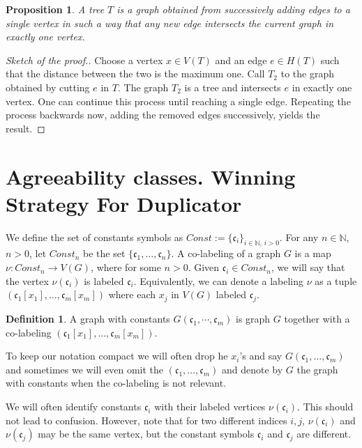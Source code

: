 \documentclass[11pt,notitlepage]{report}
\newtheorem{proposition}{Proposition}[chapter]
\theoremstyle{definition}
\newtheorem{definition}{Definition}[chapter]
\newcommand{\cc}{\mathfrak{c}}
\newcommand{\N}{\mathbb{N}}
\newcommand{\clist}{\mathfrak{c}_{1}, \cdots, \mathfrak{c}_m}
\begin{document}
\begin{proposition}
	A tree $T$ is a graph obtained from successively adding edges to a single
	vertex in such a way that any new edge intersects the current graph
	in exactly one vertex. 
\end{proposition}
\begin{proof}[Sketch of the proof.]
	Choose a vertex $x\in V(T)$ and an edge $e\in H(T)$ such that 
	the distance between the two is the maximum one. Call $T_2$
	to the graph obtained by cutting $e$ in $T$. The graph $T_2$ 
	is a tree and intersects $e$ in exactly one vertex. 
	One can continue this process until reaching a single edge.
	Repeating the process backwards now, adding the removed 
	edges successively, yields the result.  	
\end{proof}



\section{Agreeability classes. Winning Strategy For Duplicator}

We define the set of constants symbols as
$Const:=\{\mathfrak{c}_i\}_{i\in \N, \, i>0}$.
For any $n\in \N$, $n>0$, let $Const_n$ be the set $\{\mathfrak{c}_1,\dots,\mathfrak{c}_n\}$. 
A co-labeling of a graph $G$ is a map $\nu:Const_n\rightarrow V(G)$,
where for some $n>0$. Given $\mathfrak{c}_i\in Const_n$, 
we will say that the vertex $\nu(\cc_i)$ is labeled $\cc_i$.
Equivalently, we can denote a labeling $\nu$ as a tuple
$(\cc_{1}[x_1],\dots, \cc_m[x_m])$ where each 
$x_j$ in $V(G)$ labeled $\cc_j$.


\begin{definition} 
	A graph with constants $G(\clist)$ is graph $G$
	together with a co-labeling $(\cc_{1}[x_1],\dots, \cc_m[x_m])$. 
\end{definition}

To keep our notation compact we will often drop 
he $x_i$'s and say $G(\cc_1,\dots, \cc_m)$ and 
sometimes we will even omit the $(\cc_1,\dots, \cc_m)$ and
denote by $G$ the graph with constants when the co-labeling is not 
relevant. \par
We will often identify constants $\cc_i$ with their labeled vertices
$\nu(\cc_i)$. This should not lead to confusion. 
However, note that for two
different indices $i,j$, $\nu(\cc_i)$ and $\nu(\cc_j)$
may be the same vertex,
but the constant symbols $\cc_i$ and $\cc_j$ are different.\par
\end{document}
